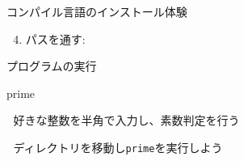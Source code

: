 \documentclass[
  ignorenonframetext,
]{beamer}
\newenvironment{Shaded}{\begin{snugshade}}{\end{snugshade}}
\newcommand{\BuiltInTok}[1]{\textcolor[rgb]{0.00,0.23,0.31}{#1}}
\newcommand{\CommentTok}[1]{\textcolor[rgb]{0.37,0.37,0.37}{#1}}
\newcommand{\ExtensionTok}[1]{\textcolor[rgb]{0.00,0.23,0.31}{#1}}
\newcommand{\FunctionTok}[1]{\textcolor[rgb]{0.28,0.35,0.67}{#1}}
\newcommand{\NormalTok}[1]{\textcolor[rgb]{0.00,0.23,0.31}{#1}}
\newcommand{\OperatorTok}[1]{\textcolor[rgb]{0.37,0.37,0.37}{#1}}
\newcommand{\StringTok}[1]{\textcolor[rgb]{0.13,0.47,0.30}{#1}}
\newcommand{\VariableTok}[1]{\textcolor[rgb]{0.07,0.07,0.07}{#1}}
\providecommand{\tightlist}{%
  \setlength{\itemsep}{0pt}\setlength{\parskip}{0pt}}\usepackage{longtable,booktabs,array}
\begin{document}
\begin{frame}[fragile]{コンパイル言語のインストール体験}
\protect\hypertarget{ux30b3ux30f3ux30d1ux30a4ux30ebux8a00ux8a9eux306eux30a4ux30f3ux30b9ux30c8ux30fcux30ebux4f53ux9a13-1}{}
\begin{enumerate}[<+->]
\setcounter{enumi}{3}
\tightlist
\item
  パスを通す:\\
\end{enumerate}

\begin{Shaded}
\end{Shaded}

プログラムの実行

\begin{Shaded}
\begin{Highlighting}[]
\ExtensionTok{prime}
\end{Highlighting}
\end{Shaded}

🔰 好きな整数を半角で入力し、素数判定を行う

🔰 ディレクトリを移動し\texttt{prime}を実行しよう
\end{frame}
\end{document}
